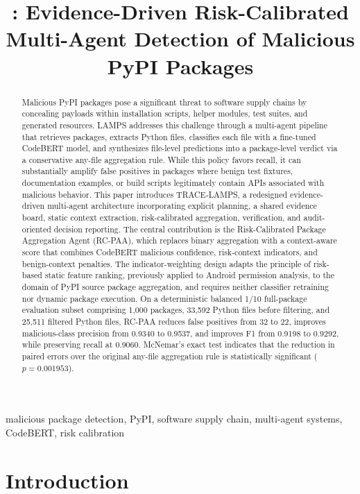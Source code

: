 \documentclass[conference,a4paper]{IEEEtran}
\title{\tracelamps{}: Evidence-Driven Risk-Calibrated Multi-Agent Detection of Malicious PyPI Packages}
\author{%
\IEEEauthorblockN{Anonymous Authors}
\IEEEauthorblockA{Department / University\\
Email: anonymous@example.com}
}
\newcommand{\rcpaa}{RC-PAA}
\newcommand{\tracelamps}{TRACE-LAMPS}
\newcommand{\codebert}{CodeBERT}
\begin{document}
\maketitle

\begin{abstract}
Malicious PyPI packages pose a significant threat to software supply chains by concealing
payloads within installation scripts, helper modules, test suites, and generated resources.
LAMPS addresses this challenge through a multi-agent pipeline that retrieves packages,
extracts Python files, classifies each file with a fine-tuned \codebert{} model, and
synthesizes file-level predictions into a package-level verdict via a conservative
any-file aggregation rule. While this policy favors recall, it can substantially amplify
false positives in packages where benign test fixtures, documentation examples, or build
scripts legitimately contain APIs associated with malicious behavior. This paper
introduces \tracelamps{}, a redesigned evidence-driven multi-agent architecture
incorporating explicit planning, a shared evidence board, static context extraction,
risk-calibrated aggregation, verification, and audit-oriented decision reporting.
The central contribution is the Risk-Calibrated Package Aggregation Agent (\rcpaa{}),
which replaces binary aggregation with a context-aware score that combines \codebert{}
malicious confidence, risk-context indicators, and benign-context penalties. The
indicator-weighting design adapts the principle of risk-based static feature ranking,
previously applied to Android permission analysis, to the domain of PyPI source package
aggregation, and requires neither classifier retraining nor dynamic package execution.
On a deterministic balanced 1/10 full-package evaluation subset comprising 1,000
packages, 33,592 Python files before filtering, and 25,511 filtered Python files,
\rcpaa{} reduces false positives from 32 to 22, improves malicious-class precision from
0.9340 to 0.9537, and improves F1 from 0.9198 to 0.9292, while preserving recall
at 0.9060. McNemar's exact test indicates that the reduction in paired errors over
the original any-file aggregation rule is statistically significant ($p=0.001953$).
\end{abstract}

\begin{IEEEkeywords}
malicious package detection, PyPI, software supply chain, multi-agent systems,
CodeBERT, risk calibration
\end{IEEEkeywords}


\section{Introduction}
\end{document}
